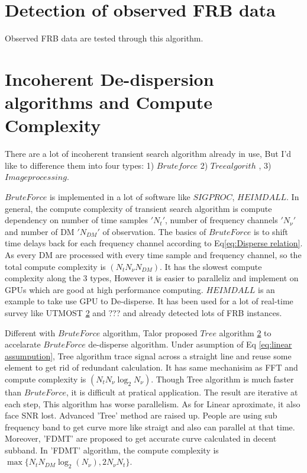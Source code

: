 \documentclass[iop]{emulateapj}
\begin{document}
\section{Detection of observed FRB data}
Observed FRB data are tested through this algorithm. 
\section{Incoherent De-dispersion algorithms and Compute Complexity}
There are a lot of incoherent transient search algorithm already in use, But I'd like to difference them into four types: 1) $Brute force$ 2) $Tree algorith$ , 3) $Image processing$.  

$Brute Force$ is implemented in a lot of software like $SIGPROC$, $HEIMDALL$. In general, the compute complexity of transient search algorithm is compute dependency on number of time samples $'N_t'$, number of frequency channels $'N_{\nu}'$ and number of DM $'N_{DM}'$ of observation. The basics of $Brute Force$ is to shift time delays back for each frequency channel according to Eq\ref{eq:Disperse relation}. As every DM are processed with every time sample and frequency channel, so the total compute complexity is $(N_t N_{\nu} N_{DM})$. It has the slowest compute complexity along the 3 types, However it is easier to paralleliz and implement on GPUs which are good at high performance computing. $HEIMDALL$ is an example to take use GPU to De-disperse. It has been used for a lot of real-time survey like UTMOST \ref{} and ??? and already detected lots of FRB instances. 

Different with $Brute Force$ algorithm, Talor proposed $Tree$ algorithm \ref{} to accelarate $Brute Force$ de-disperse algorithm. Under asumption of Eq \ref{eq:linear assumpution}, Tree algorithm trace signal across a straight line and reuse some element to get rid of redundant calculation. It has same mechanisim as FFT and compute complexity is $(N_t N_{\nu} \log_2{N_{\nu}})$.	Though Tree algorithm is much faster than $Brute Force$, it is difficult at pratical application. The result are iterative at each step, This algorithm has worse  parallelism. As for Linear aproximate, it also face SNR lost. Advanced 'Tree' method are raised up. People are using sub frequency band to get curve more like straigt and also can parallel at that time. Moreover, 'FDMT' are proposed to get accurate curve calculated in decent subband. In 'FDMT' algorithm, the compute complexity is $\max \{N_tN_{DM}\log_2(N_{\nu}),2N_{\nu}N_t\}$.
\end{document}
